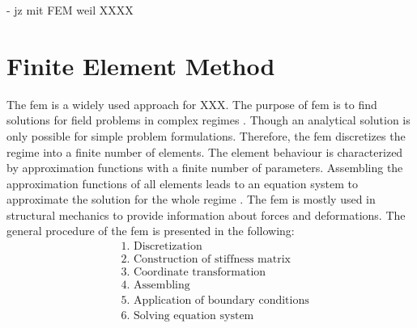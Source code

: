 



- jz mit FEM weil XXXX


\section{Finite Element Method} \label{sec: FEMBasics}

The \acrfull{fem} is a widely used approach for XXX. 
The purpose of \acrshort{fem} is to find solutions for field problems in complex regimes \cite{willner_vorlesungsskript_nodate}. Though an analytical solution is only possible for simple problem formulations. Therefore, the \acrshort{fem} discretizes the regime into a finite number of elements. The element behaviour is characterized by approximation functions with a finite number of parameters. Assembling the approximation functions of all elements leads to an equation system to approximate the solution for the whole regime \cite{jagota_finite_nodate}. The \acrshort{fem} is mostly used in structural mechanics to provide information about forces and deformations. The general procedure of the \acrshort{fem} is presented in the following: \\

\begin{align*}
    &\text{1. Discretization} \\
    &\text{2. Construction of stiffness matrix}\\ 
    &\text{3. Coordinate transformation} \\
    &\text{4. Assembling} \\
    &\text{5. Application of boundary conditions} \\
    &\text{6. Solving equation system}
\end{align*}

